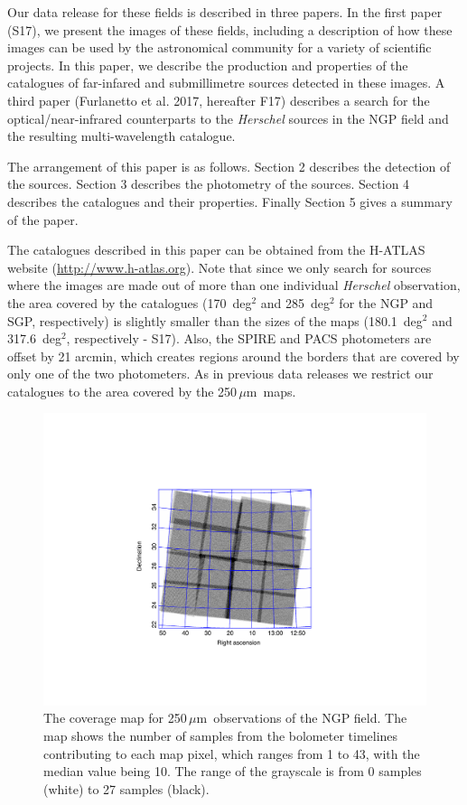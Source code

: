 \documentclass[a4paper,fleqn,usenatbib, twocolumn]{aastex61}
\def\mic{\,$\mu $m}
\begin{document}
Our data release for these fields is described in three papers. In the
first paper (S17), we present the images of these fields, including a
description of how these images can be used by the astronomical
community for a variety of scientific projects.  In this paper, we
describe the production and properties of the catalogues of
far-infared and submillimetre sources detected in these images. A
third paper (Furlanetto et al. 2017, hereafter F17) describes a search
for the optical/near-infrared counterparts to the {\it Herschel}
sources in the NGP field and the resulting multi-wavelength catalogue.

The arrangement of this paper is as follows. Section 2 describes the
detection of the sources. Section 3 describes the photometry of the
sources. Section 4 describes the catalogues and their properties.
Finally Section 5 gives a summary of the paper.

The catalogues described in this paper can be obtained from the
H-ATLAS website (\url{http://www.h-atlas.org}).  Note that since we only
search for sources where the images are made out of more than one
individual {\it Herschel} observation, the area covered by the
catalogues (170~deg$^2$ and 285~deg$^2$ for the NGP and SGP,
respectively) is slightly smaller than the sizes of the maps
(180.1~deg$^2$ and 317.6~deg$^2$, respectively - S17).  Also, the
SPIRE and PACS photometers are offset by 21 arcmin, which creates
regions around the borders that are covered by only one of the two
photometers. As in previous data releases we restrict our catalogues
to the area covered by the 250\mic\ maps.

\begin{figure} %
\includegraphics[scale=0.9, trim=0.0mm 5.0mm 0.0mm 0.0mm, clip=True]{ngpcoverage.pdf}
\caption{\protect\label{skymapn} The coverage map for 250\mic\ observations
of the NGP field.
The map shows the number of samples from the bolometer timelines contributing
to each map pixel, which ranges from 1 to 43, with the median value being 10.
The range of the grayscale is from 0 samples (white) to 27 samples
(black).}

\end{figure}
\end{document}
